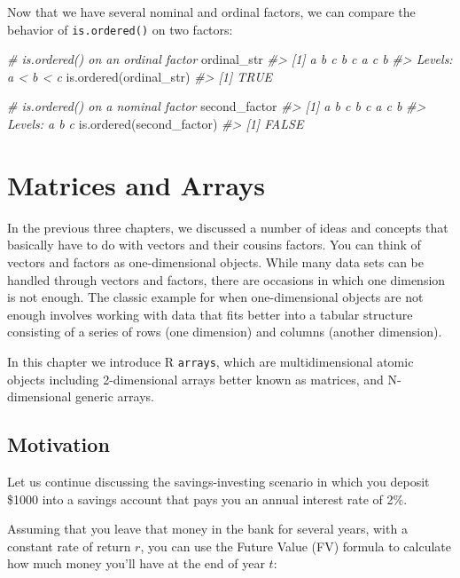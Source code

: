 \documentclass[
]{book}
\newenvironment{Shaded}{\begin{snugshade}}{\end{snugshade}}
\newcommand{\CommentTok}[1]{\textcolor[rgb]{0.56,0.35,0.01}{\textit{#1}}}
\newcommand{\FunctionTok}[1]{\textcolor[rgb]{0.00,0.00,0.00}{#1}}
\newcommand{\NormalTok}[1]{#1}
\begin{document}
Now that we have several nominal and ordinal factors, we can compare the
behavior of \texttt{is.ordered()} on two factors:

\begin{Shaded}
\begin{Highlighting}[]
\CommentTok{\# is.ordered() on an ordinal factor}
\NormalTok{ordinal\_str}
\CommentTok{\#\textgreater{} [1] a b c b c a c b}
\CommentTok{\#\textgreater{} Levels: a \textless{} b \textless{} c}
\FunctionTok{is.ordered}\NormalTok{(ordinal\_str)}
\CommentTok{\#\textgreater{} [1] TRUE}

\CommentTok{\# is.ordered() on a nominal factor}
\NormalTok{second\_factor}
\CommentTok{\#\textgreater{} [1] a b c b c a c b}
\CommentTok{\#\textgreater{} Levels: a b c}
\FunctionTok{is.ordered}\NormalTok{(second\_factor)}
\CommentTok{\#\textgreater{} [1] FALSE}
\end{Highlighting}
\end{Shaded}

\hypertarget{arrays}{%
\chapter{Matrices and Arrays}\label{arrays}}

In the previous three chapters, we discussed a number of ideas and concepts that basically have to do with vectors and their cousins factors. You can think of
vectors and factors as one-dimensional objects. While many data sets can be
handled through vectors and factors, there are occasions in which one dimension
is not enough. The classic example for when one-dimensional objects are not
enough involves working with data that fits better into a tabular structure
consisting of a series of rows (one dimension) and columns (another dimension).

In this chapter we introduce R \texttt{arrays}, which are multidimensional atomic
objects including 2-dimensional arrays better known as matrices, and
N-dimensional generic arrays.

\hypertarget{motivation}{%
\section{Motivation}\label{motivation}}

Let us continue discussing the savings-investing scenario in which you deposit
\$1000 into a savings account that pays you an annual interest rate of 2\%.

Assuming that you leave that money in the bank for several years, with a
constant rate of return \(r\), you can use the Future Value (FV) formula to
calculate how much money you'll have at the end of year \(t\):
\end{document}
